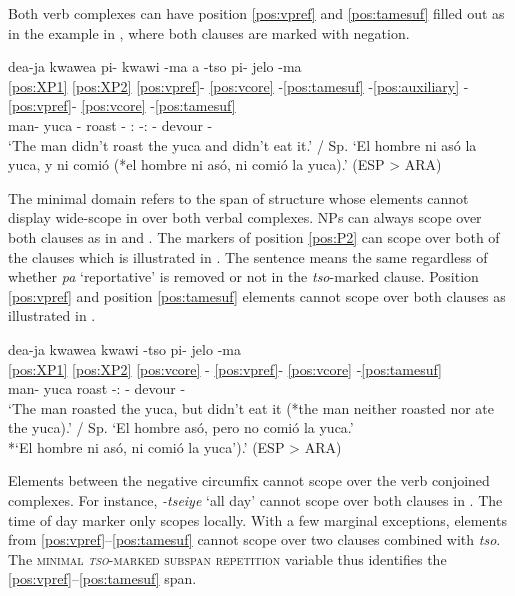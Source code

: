 \documentclass[output=paper,hidelinks]{langscibook}
\begin{document}

Both verb complexes can have position \ref{pos:vpref} and \ref{pos:tamesuf} filled out as in the example in , where both clauses are marked with negation.

\ea \label{ex:pikwawima...pijeloma}
    \glll dea-ja kwawea pi- kwawi -ma a -tso pi- jelo -ma \\ 
    \ref{pos:XP1} \ref{pos:XP2} \ref{pos:vpref}- \ref{pos:vcore} -\ref{pos:tamesuf} -\ref{pos:auxiliary} - \ref{pos:vpref}- \ref{pos:vcore} -\ref{pos:tamesuf}    \\
    man-\Erg{} yuca \Neg{}- roast -\Neg{} \Aux{}:\Tr{} -\Prior{}:\Compl{} \Neg{}- devour -\Neg{}    \\
    \glt `The man didn't roast the yuca and didn't eat it.' / Sp. `El hombre ni asó la yuca, y ni comió (*el hombre ni asó, ni comió la yuca).'  \hfill (ESP > ARA)
\z 


The minimal domain refers to the span of structure whose elements cannot display wide-scope in over both verbal complexes. NPs can always scope over both clauses as in  and . The markers of position \ref{pos:P2} can scope over both of the clauses which is illustrated in . The sentence means the same regardless of whether \textit{pa} `reportative' is removed or not in the \textit{tso}-marked clause.
Position \ref{pos:vpref} and position \ref{pos:tamesuf} elements cannot scope over both clauses as illustrated in .

\ea \label{ex:pijeloma}
    \glll dea-ja kwawea kwawi -tso pi- jelo -ma \\ 
    \ref{pos:XP1} \ref{pos:XP2} \ref{pos:vcore} - \ref{pos:vpref}- \ref{pos:vcore} -\ref{pos:tamesuf}    \\
    man-\Erg{} yuca roast -\Prior{}:\Compl{} \Neg{}- devour -\Neg{}    \\
    \glt `The man roasted the yuca, but didn't eat it (*the man neither roasted nor ate the yuca).' / Sp. `El hombre asó, pero no comió la yuca.' \\ *`El hombre ni asó, ni comió la yuca').'  \hfill (ESP > ARA)
\z 


\largerpage
Elements between the negative circumfix cannot scope over the verb conjoined complexes. For instance, \textit{-tseiye} `all day' cannot scope over both clauses in . The time of day marker only scopes locally. With a few marginal exceptions, elements from \ref{pos:vpref}--\ref{pos:tamesuf} cannot scope over two clauses combined with \textit{tso}. The \textsc{minimal \textit{tso}-marked subspan repetition} variable thus identifies the \ref{pos:vpref}--\ref{pos:tamesuf} span.
\end{document}
